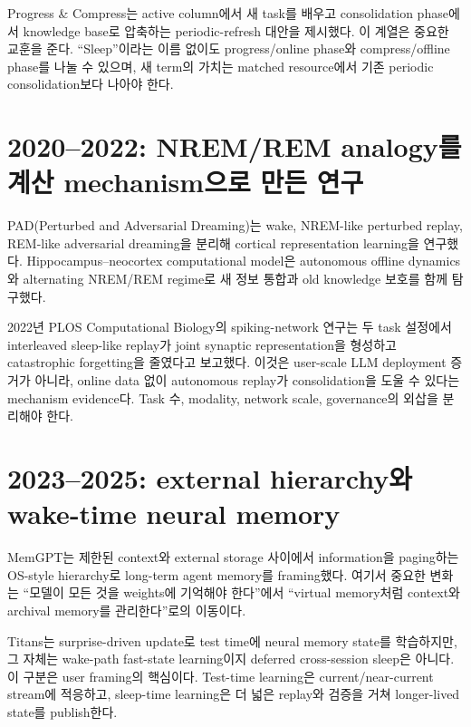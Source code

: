 Progress \& Compress는 active column에서 새 task를 배우고 consolidation phase에서 knowledge base로
압축하는 periodic-refresh 대안을 제시했다. \parencite{srcstc0007} 이 계열은 중요한
교훈을 준다. ``Sleep''이라는 이름 없이도 progress/online phase와 compress/offline phase를 나눌 수
있으며, 새 term의 가치는 matched resource에서 기존 periodic consolidation보다 나아야 한다.

\section{2020–2022: NREM/REM analogy를 계산 mechanism으로 만든 연구}

PAD(Perturbed and Adversarial Dreaming)는 wake, NREM-like perturbed replay, REM-like adversarial dreaming을
분리해 cortical representation learning을 연구했다. \parencite{srcstc0009}
Hippocampus--neocortex computational model은 autonomous offline dynamics와 alternating NREM/REM regime로
새 정보 통합과 old knowledge 보호를 함께 탐구했다. \parencite{srcstc0010}

2022년 PLOS Computational Biology의 spiking-network 연구는 두 task 설정에서 interleaved sleep-like
replay가 joint synaptic representation을 형성하고 catastrophic forgetting을 줄였다고 보고했다.
 \parencite{srcstc0011} 이것은 user-scale LLM deployment 증거가 아니라, online data 없이
autonomous replay가 consolidation을 도울 수 있다는 mechanism evidence다. Task 수, modality, network
scale, governance의 외삽을 분리해야 한다.

\section{2023–2025: external hierarchy와 wake-time neural memory}

MemGPT는 제한된 context와 external storage 사이에서 information을 paging하는 OS-style hierarchy로
long-term agent memory를 framing했다. \parencite{srcstc0013} 여기서 중요한 변화는
``모델이 모든 것을 weights에 기억해야 한다''에서 ``virtual memory처럼 context와 archival memory를
관리한다''로의 이동이다.

Titans는 surprise-driven update로 test time에 neural memory state를 학습하지만, 그 자체는 wake-path
fast-state learning이지 deferred cross-session sleep은 아니다.
\parencite{srcstc0017} 이 구분은 user framing의 핵심이다. Test-time learning은 current/near-current
stream에 적응하고, sleep-time learning은 더 넓은 replay와 검증을 거쳐 longer-lived state를 publish한다.

